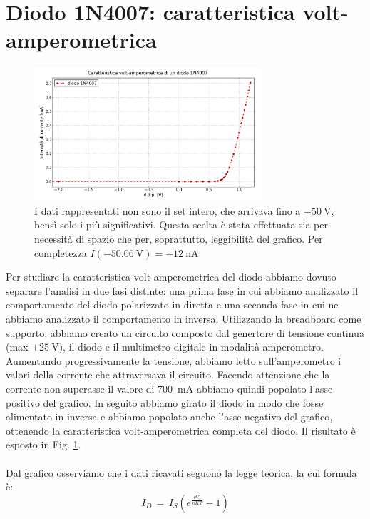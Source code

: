 \section{Diodo 1N4007: caratteristica volt-amperometrica}

\begin{figure}
	\label{fig:diodo}
	\includegraphics[width=0.75\textwidth]{diodo.pdf}
	\caption{I dati rappresentati non sono il set intero, che arrivava fino a $\SI{-50}{\volt}$, bensì solo i più significativi. Questa scelta è stata effettuata sia per necessità di spazio che per, soprattutto, leggibilità del grafico. Per completezza $I(\SI{-50.06}{\volt}) = \SI{-12}{\nano\ampere}$}
\end{figure}

Per studiare la caratteristica volt-amperometrica del diodo abbiamo dovuto separare l'analisi in due fasi distinte: una prima fase in cui abbiamo analizzato il comportamento del diodo polarizzato in diretta e una seconda fase in cui ne abbiamo analizzato il comportamento in inversa.
Utilizzando la breadboard come supporto, abbiamo creato un circuito composto dal genertore di tensione continua (max $\pm \SI{25}{\volt}$), il diodo e il multimetro digitale in modalità amperometro. Aumentando progressivamente la tensione, abbiamo letto sull'amperometro i valori della corrente che attraversava il circuito.
Facendo attenzione che la corrente non superasse il valore di \SI{700}{\milli\ampere} abbiamo quindi popolato l'asse positivo del grafico. In seguito abbiamo girato il diodo in modo che fosse alimentato in inversa e abbiamo popolato anche l'asse negativo del grafico, ottenendo la caratteristica volt-amperometrica completa del diodo. Il risultato è esposto in Fig. \ref{fig:diodo}.
\\
\\
Dal grafico osserviamo che i dati ricavati seguono la legge teorica, la cui formula è:
\begin{equation}
I_{D} \, = \, I_{S} \left( e^{\frac{q V_d}{nKT}} -1 \right)
\label{eq:diode}
\end{equation}

